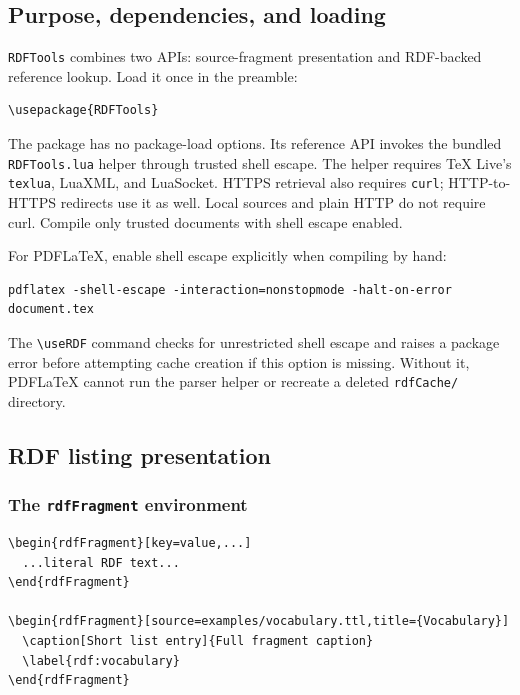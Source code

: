 \documentclass[10pt,letterpaper]{article}
\newcommand{\pkg}[1]{\texttt{#1}}
\begin{document}
\subsection{Purpose, dependencies, and loading}

\pkg{RDFTools} combines two APIs: source-fragment presentation and RDF-backed
reference lookup. Load it once in the preamble:

\begin{lstlisting}
\usepackage{RDFTools}
\end{lstlisting}

The package has no package-load options. Its reference API invokes the
bundled \pkg{RDFTools.lua} helper through trusted shell escape. The helper
requires TeX Live's \pkg{texlua}, LuaXML, and LuaSocket. HTTPS retrieval also
requires \pkg{curl}; HTTP-to-HTTPS redirects use it as well. Local sources and
plain HTTP do not require curl. Compile only trusted documents with shell
escape enabled.

For PDFLaTeX, enable shell escape explicitly when compiling by hand:
\begin{lstlisting}
pdflatex -shell-escape -interaction=nonstopmode -halt-on-error document.tex
\end{lstlisting}
The \verb|\useRDF| command checks for unrestricted shell escape and raises a
package error before attempting cache creation if this option is missing.
Without it, PDFLaTeX cannot run the parser helper or recreate a deleted
\texttt{rdfCache/} directory.

\subsection{RDF listing presentation}

\subsubsection{The \texttt{rdfFragment} environment}

\begin{lstlisting}
\begin{rdfFragment}[key=value,...]
  ...literal RDF text...
\end{rdfFragment}

\begin{rdfFragment}[source=examples/vocabulary.ttl,title={Vocabulary}]
  \caption[Short list entry]{Full fragment caption}
  \label{rdf:vocabulary}
\end{rdfFragment}
\end{lstlisting}
\end{document}
